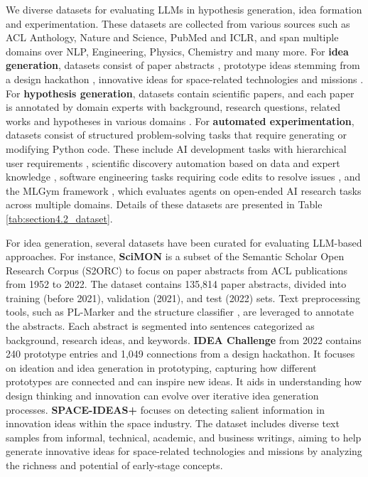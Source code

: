 We %
 diverse %
datasets for evaluating LLMs in hypothesis generation, idea formation and experimentation. These datasets are collected from various sources such as ACL Anthology, Nature and Science, PubMed and ICLR, and span multiple domains over NLP, Engineering, Physics, Chemistry and many more. For \textbf{idea generation}, datasets consist of paper abstracts \cite{chai2024exploring}, prototype ideas stemming from a design hackathon \cite{ege2023idea}, innovative ideas for space-related technologies and missions \cite{garcia-silva-etal-2024-space}. For \textbf{hypothesis generation}, datasets contain scientific papers, and each paper is annotated by domain experts with background, research questions, related works and hypotheses in various domains \cite{yang2024moose, yang2023large, qi2024large}. For \textbf{automated experimentation}, datasets consist of structured problem-solving tasks that require generating or modifying Python code. These include AI development tasks with hierarchical user requirements \cite{zhuge2024agent}, scientific discovery automation based on data and expert knowledge \cite{chen2024scienceagentbenchrigorousassessmentlanguage}, software engineering tasks requiring code edits to resolve issues \cite{jimenez2024swebench}, and the MLGym framework \cite{nathani2025mlgymnewframeworkbenchmark}, which evaluates agents on open-ended AI research tasks across multiple domains. Details of these datasets are presented in Table \ref{tab:section4.2_dataset}.

\iffalse
    For idea generation, several datasets have been curated for evaluating LLM-based approaches. For instance, \textbf{SciMON} \cite{chai2024exploring} is a subset of the Semantic Scholar Open Research Corpus (S2ORC) \cite{lo2019s2orc} to focus on paper abstracts from ACL publications from 1952 to 2022. The dataset contains 135,814 paper abstracts, divided into training (before 2021), validation (2021), and test (2022) sets. 
    Text preprocessing tools, such as PL-Marker \cite{ye2021packed} and the structure classifier \cite{cohan2019pretrained}, are leveraged to annotate the abstracts. Each abstract is segmented into sentences categorized as background, research ideas, and keywords. \textbf{IDEA Challenge} \cite{ege2023idea} from 2022 contains 240 prototype entries and 1,049 connections from a design hackathon. It focuses on ideation and idea generation in prototyping, capturing how different prototypes are connected and can inspire new ideas. It aids in understanding how design thinking and innovation can evolve over iterative idea generation processes. \textbf{SPACE-IDEAS+} \cite{garcia-silva-etal-2024-space} focuses on detecting salient information in innovation ideas within the space industry. The dataset includes diverse text samples from informal, technical, academic, and business writings, aiming to help generate innovative ideas for space-related technologies and missions by analyzing the richness and potential of early-stage concepts.

